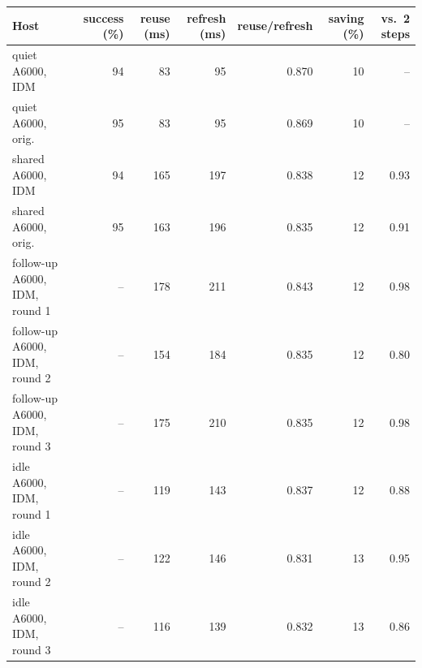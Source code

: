 \begin{tabular}{@{}lrrrrrr@{}}
\toprule
Host & success (\%) & reuse (ms) & refresh (ms) & reuse/refresh & saving (\%) & vs.\ 2 steps \\
\midrule
quiet A6000, IDM & 94 & 83 & 95 & 0.870 & 10 & -- \\
quiet A6000, orig. & 95 & 83 & 95 & 0.869 & 10 & -- \\
shared A6000, IDM & 94 & 165 & 197 & 0.838 & 12 & 0.93 \\
shared A6000, orig. & 95 & 163 & 196 & 0.835 & 12 & 0.91 \\
follow-up A6000, IDM, round 1 & -- & 178 & 211 & 0.843 & 12 & 0.98 \\
follow-up A6000, IDM, round 2 & -- & 154 & 184 & 0.835 & 12 & 0.80 \\
follow-up A6000, IDM, round 3 & -- & 175 & 210 & 0.835 & 12 & 0.98 \\
idle A6000, IDM, round 1 & -- & 119 & 143 & 0.837 & 12 & 0.88 \\
idle A6000, IDM, round 2 & -- & 122 & 146 & 0.831 & 13 & 0.95 \\
idle A6000, IDM, round 3 & -- & 116 & 139 & 0.832 & 13 & 0.86 \\
\bottomrule
\end{tabular}
